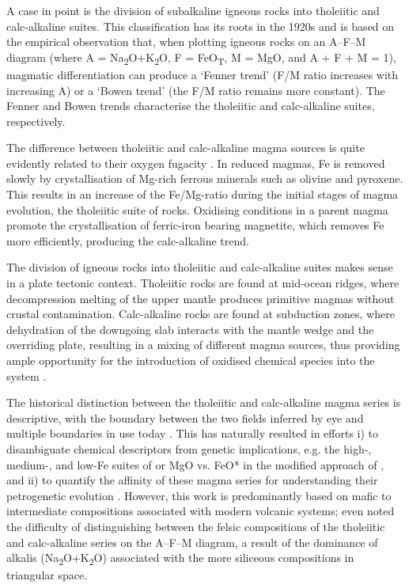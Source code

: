 \documentclass{article}
\begin{document}
A case in point is the division of subalkaline igneous rocks into
tholeiitic and calc-alkaline suites. This classification has its roots
in the 1920s \citep{bowen1928, fenner1929, kennedy1933, tilley1950}
and is based on the empirical observation that, when plotting igneous
rocks on an A--F--M diagram (where A =
Na\textsubscript{2}O+K\textsubscript{2}O, F = FeO\textsubscript{T}, M
= MgO, and A + F + M = 1), magmatic differentiation can produce a
`Fenner trend' (F/M ratio increases with increasing A) or a `Bowen
trend' (the F/M ratio remains more constant). The Fenner and Bowen
trends characterise the tholeiitic and calc-alkaline suites,
respectively.\medskip

The difference between tholeiitic and calc-alkaline magma sources is
quite evidently related to their oxygen fugacity \citep{osborn1959}.
In reduced magmas, Fe is removed slowly by crystallisation of Mg-rich
ferrous minerals such as olivine and pyroxene. This results in an
increase of the Fe/Mg-ratio during the initial stages of magma
evolution, the tholeiitic suite of rocks. Oxidising conditions in a
parent magma promote the crystallisation of ferric-iron bearing
magnetite, which removes Fe more efficiently, producing the
calc-alkaline trend.\medskip

The division of igneous rocks into tholeiitic and calc-alkaline suites
makes sense in a plate tectonic context. Tholeiitic rocks are found at
mid-ocean ridges, where decompression melting of the upper mantle
produces primitive magmas without crustal contamination.
Calc-alkaline rocks are found at subduction zones, where dehydration
of the downgoing slab interacts with the mantle wedge and the
overriding plate, resulting in a mixing of different magma sources,
thus providing ample opportunity for the introduction of oxidised
chemical species into the system \citep{kelley2009}.\medskip

The historical distinction between the tholeiitic and calc-alkaline
magma series is descriptive, with the boundary between the two fields
inferred by eye and multiple boundaries in use today
\citep[e.g.,][]{kuno1968, irvine1971, rollinson2021}. This has
naturally resulted in efforts i) to disambiguate chemical descriptors
from genetic implications, e.g. the high-, medium-, and low-Fe suites
of \citet{arculus2003} or MgO vs. FeO* in the modified approach of
\citet{pearce2010}, and ii) to quantify the affinity of these magma
series for understanding their petrogenetic evolution \citep[the
  Tholeiitic Index of][]{zimmer2010}. However, this work is
predominantly based on mafic to intermediate compositions associated
with modern volcanic systems; even \citet{irvine1971} noted the
difficulty of distinguishing between the felsic compositions of the
tholeiitic and calc-alkaline series on the A--F--M diagram, a result
of the dominance of alkalis (Na\textsubscript{2}O+K\textsubscript{2}O)
associated with the more siliceous compositions in triangular
space.\medskip
\end{document}
